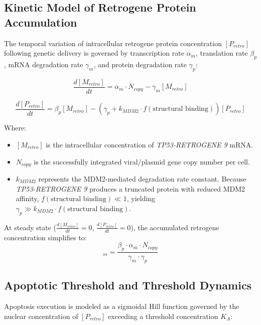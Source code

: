\documentclass[12pt]{article}
\begin{document}
\subsection{Kinetic Model of Retrogene Protein Accumulation}

The temporal variation of intracellular retrogene protein concentration $[P_{retro}]$ following genetic delivery is governed by transcription rate $\alpha_m$, translation rate $\beta_p$, mRNA degradation rate $\gamma_m$, and protein degradation rate $\gamma_p$:

\begin{equation}
\frac{d[M_{retro}]}{dt} = \alpha_m \cdot N_{copy} - \gamma_m [M_{retro}]
\end{equation}

\begin{equation}
\frac{d[P_{retro}]}{dt} = \beta_p [M_{retro}] - \left( \gamma_p + k_{MDM2} \cdot f(\text{structural binding}) \right) [P_{retro}]
\end{equation}

Where:
\begin{itemize}
    \item $[M_{retro}]$ is the intracellular concentration of \textit{TP53-RETROGENE 9} mRNA.
    \item $N_{copy}$ is the successfully integrated viral/plasmid gene copy number per cell.
    \item $k_{MDM2}$ represents the MDM2-mediated degradation rate constant. Because \textit{TP53-RETROGENE 9} produces a truncated protein with reduced MDM2 affinity, $f(\text{structural binding}) \ll 1$, yielding $\gamma_p \gg k_{MDM2} \cdot f(\text{structural binding})$.
\end{itemize}

At steady state ($\frac{d[M_{retro}]}{dt} = 0$, $\frac{d[P_{retro}]}{dt} = 0$), the accumulated retrogene concentration simplifies to:
\begin{equation}
[P_{retro}]_{ss} = \frac{\beta_p \cdot \alpha_m \cdot N_{copy}}{\gamma_m \cdot \gamma_p}
\end{equation}

\subsection{Apoptotic Threshold and Threshold Dynamics}

Apoptosis execution is modeled as a sigmoidal Hill function governed by the nuclear concentration of $[P_{retro}]$ exceeding a threshold concentration $K_A$:
\end{document}
